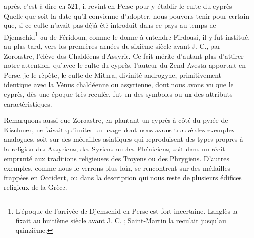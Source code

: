 \documentclass[a4paper, 11pt, oneside, polutonikogreek, french]{article}
\begin{document}
après, c'est-à-dire en 521, il revint en Perse pour y établir le culte du cyprès. Quelle que soit la date qu'il convienne d'adopter, nous pouvons tenir pour certain que, si ce culte n'avait pas déjà été introduit dans ce pays au temps de Djemschid\footnote{L'époque de l'arrivée de Djemschid en Perse est fort incertaine. Langlès la fixait au huitième siècle avant J. C. ; Saint-Martin la reculait jusqu'au quinzième.} ou de Féridoun, comme le donne à entendre Firdousi, il y fut institué, au plus tard, vers les premières années du sixième siècle avant J. C., par Zoroastre, l'élève des Chaldéens d'Assyrie. Ce fait mérite d'autant plus d'attirer notre attention, qu'avec le culte du cyprès, l'auteur du Zend-Avesta apportait en Perse, je le répète, le culte de Mithra, divinité androgyne, primitivement identique avec la Vénus chaldéenne ou assyrienne, dont nous avons vu que le cyprès, dès une époque très-reculée, fut un des symboles ou un des attributs caractéristiques.

Remarquons aussi que Zoroastre, en plantant un cyprès à côté du pyrée de Kischmer, ne faisait qu'imiter un usage dont nous avons trouvé des exemples analogues, soit sur des médailles asiatiques qui reproduisent des types propres à la religion des Assyriens, des Syriens ou des Phéniciens, soit dans un récit emprunté aux traditions religieuses des Troyens ou des Phrygiens. D'autres exemples, comme nous le verrons plus loin, se rencontrent sur des médailles frappées en Occident, ou dans la description qui nous reste de plusieurs édifices religieux de la Grèce.
\end{document}
